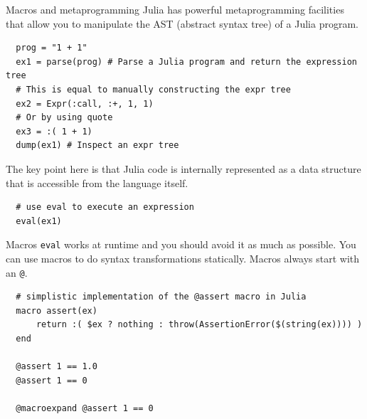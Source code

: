 \documentclass{beamer}
\begin{document}
\begin{frame}{Macros and metaprogramming}
  Julia has powerful metaprogramming facilities that allow you to manipulate the AST (abstract syntax tree) of a Julia program.
  \begin{lstlisting}
  prog = "1 + 1"
  ex1 = parse(prog) # Parse a Julia program and return the expression tree
  # This is equal to manually constructing the expr tree
  ex2 = Expr(:call, :+, 1, 1)
  # Or by using quote
  ex3 = :( 1 + 1) 
  dump(ex1) # Inspect an expr tree
  \end{lstlisting}
  \vspace{-1em}
  \begin{block}{}
    The key point here is that Julia code is internally represented as a data structure that is accessible from the language itself.
  \end{block}
  \vspace{-1em}
  \begin{lstlisting}
  # use eval to execute an expression
  eval(ex1)
  \end{lstlisting}
  \framebreak
  \begin{block}{Macros}
    \lstinline{eval} works at runtime and you should avoid it as much as possible. You can use macros to do syntax transformations statically.
    Macros always start with an \verb|@|.
  \end{block}
  \begin{lstlisting}
  # simplistic implementation of the @assert macro in Julia
  macro assert(ex)
      return :( $ex ? nothing : throw(AssertionError($(string(ex)))) )
  end

  @assert 1 == 1.0
  @assert 1 == 0

  @macroexpand @assert 1 == 0
  \end{lstlisting}
\end{frame}
\end{document}
